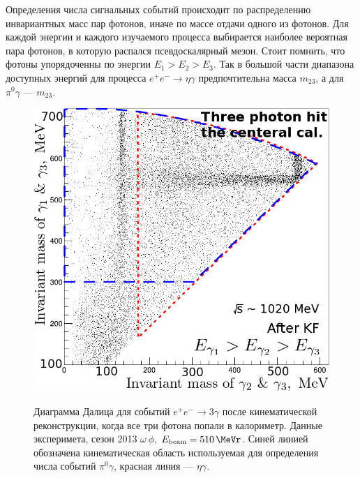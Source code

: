 Определения числа сигнальных событий происходит по распределению инвариантных масс пар фотонов,
иначе по массе отдачи одного из фотонов.
Для каждой энергии и каждого  изучаемого процесса выбирается наиболее вероятная пара фотонов,
в которую распался псевдоскалярный мезон.
Стоит помнить, что фотоны упорядоченны по энергии $E_1 > E_2 > E_3$.
Так в большой части диапазона доступных энергий для процесса $e^+ e^- \to \eta \gamma$ предпочтительна масса $m_{23}$,
а для $\pi^0 \gamma$ --- $m_{23}$.

\begin{figure}
	\begin{minipage}[T]{.48\textwidth}
		\centering
		\label{fig:cm12cal2}
		\includegraphics[width=\textwidth]{img/cm12cal2.png}
		\caption{Диаграмма Далица для событий $e^+ e^- \to 3 \gamma$ после кинематической реконструкции,
			когда все три фотона попали в  калориметр.
			Данные эксперимета, сезон 2013 $\omega \ \phi$, $E_{\text{beam}} = \SI{510}{\MeVr}$.
			Синей линией обозначена кинематическая область используемая для определения числа событий $\pi^0 \gamma$,
			красная линия --- $\eta \gamma$.}
	\end{minipage}
	\hfill
	\begin{minipage}[T]{.48\textwidth}
		\centering
		\label{fig:etag}

\end{minipage}
\end{figure}
